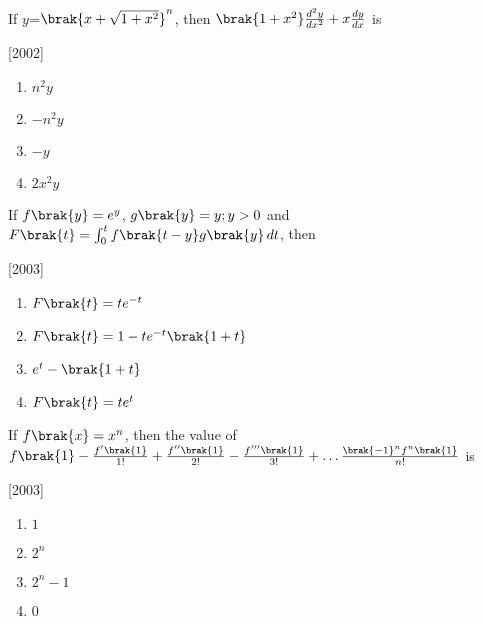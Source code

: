\iffalse
\title{Assignment 2 \\ 12. Differentiation}
\author{EE24BTECH11049 \\ Patnam Shariq Faraz Muhammed}
\section*{mains}
\fi


	\item
	If $y$=$\brak{x+\sqrt{1+x^{2}}}^{n}$, then $\brak{1+x^{2}}\frac{d^{2}y}{dx^{2}} + x\frac{dy}{dx}$ is

	\hfill[2002]
	
	\begin{multicols}{4}
		\begin{enumerate}
			\item $n^{2}y$
			\item $-n^{2}y$
			\item $-y$
			\item $2x^{2}y$
		\end{enumerate}
	\end{multicols}

	\item
	If $f\brak{y}=e^{y}$, $g\brak{y}=y; y>0$ and $F\brak{t}= \int_{0}^{t}{f\brak{t-y}g\brak{y} \, dt}$, then

	\hfill[2003]

	\begin{enumerate}
		\item $F\brak{t}=te^{-t}$
		\item $F\brak{t}=1-te^{-t}\brak{1+t}$
		\item $e^{t}-\brak{1+t}$
		\item $F\brak{t}=te^{t}$
	\end{enumerate}

	\item 
	If $f\brak{x}=x^{n}$, then the value of $f\brak{1}-\frac{f^{\prime}\brak{1}}{1!}+\frac{{f^{\prime\prime}\brak{1}}}{2!}-\frac{{f^{\prime\prime\prime}\brak{1}}}{3!}+\dots \frac{\brak{-1}^nf^{n}\brak{1}}{n!}$ is

	\hfill[2003]
	
	\begin{multicols}{4}
		\begin{enumerate}
			\item $1$
			\item $2^{n}$
			\item $2^{n}-1$
			\item $0$
		\end{enumerate}
	\end{multicols}

